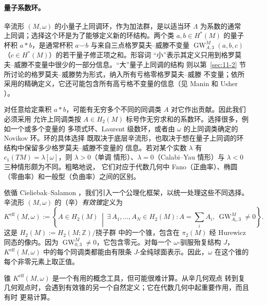 \paragraph{量子系数环。}
辛流形 $(M,\omega)$ 的小量子上同调环，作为加法群，是以适当环 $\Lambda$ 为系数的通常
上同调；选择这个环是为了能够定义新的环结构。两个类 $a,b\in H^*(M)$ 的量子杯积
$a*b$，是通常杯积 $a\smile b$ 与来自三点格罗莫夫--威滕不变量
$\operatorname{GW}_{A,3}^M(a,b,c)$（$c\in H^*(M)$）的若干量子修正项之和。形容词
“小”表示其定义只用到格罗莫夫--威滕不变量中很少的一部分信息。“大”量子上同调的结构
则以第~\ref{sec:11-2} 节所讨论的格罗莫夫--威滕势为形式，纳入所有亏格零格罗莫夫--威滕
不变量；依所采用的精确定义，它还可能包含所有高亏格不变量的信息（见 Manin
 和 Usher ）。

对任意给定乘积 $a*b$，可能有无穷多个不同的同调类 $A$ 对它作出贡献。因此我们必须采用
允许上同调类按 $A\in H_2(M)$ 标号作无穷求和的系数环。选择很多，例如一个或多个变量的
多项式环、Laurent 级数环，或者由 $\omega$ 的上同调类确定的 Novikov 环。环的具体选择
既取决于底层辛流形，也取决于想在量子上同调的环结构中保留多少格罗莫夫--威滕不变量的
信息。若对某个实数 $\lambda$ 有 $c_1(TM)=\lambda[\omega]$，则 $\lambda>0$（单调
情形）、$\lambda=0$（Calabi--Yau 情形）与 $\lambda<0$ 三种情形颇为不同。粗略地说，
它们对应于代数几何中 Fano（正曲率）、椭圆（零曲率）和一般型（负曲率）之间的区别。

依循 Cieliebak--Salamon ，我们引入一个公理化框架，以统一处理这些不同选择。
辛流形 $(M,\omega)$ 的（辛）\emph{有效锥}定义为
\[
  K^{\mathrm{eff}}(M,\omega)
  :=\left\{A\in H_2(M)\ \middle|\
  \exists\,A_1,\ldots,A_N\in H_2(M):
  A=\sum_iA_i,\ 
  \operatorname{GW}_{A_i,3}^M\ne0\right\}.
\]
这是 $H_2(M):=H_2(M;\mathbb Z)/\text{挠子群}$ 中的一个锥，包含在 $\pi_2(M)$ 经
Hurewicz 同态的像内。因为 $\operatorname{GW}_{0,3}^M\ne0$，它包含零元。对每一个
$\omega$-\BookRecordIndex{T0372}驯服\BookRecordIndex{T0088}殆复结构 $J$，$K^{\mathrm{eff}}(M,\omega)$ 中的每个同调类都能由有限条
$J$-全纯球面表示。因此，$\omega$ 在这个锥的每个非零元素上取正值。

锥 $K^{\mathrm{eff}}(M,\omega)$ 是一个有用的概念工具，但可能很难计算。从辛几何观点
转到复几何观点时，会遇到有效锥的另一个自然定义；它在代数几何中起重要作用，而且有时
更易计算。

